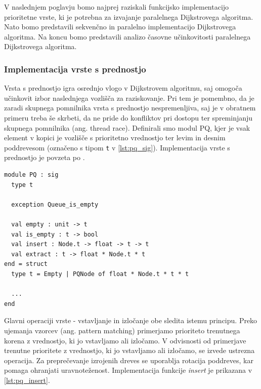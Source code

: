 \documentclass[mat1, tisk]{fmfdelo}
\begin{document}
V naslednjem poglavju bomo najprej raziskali funkcijsko implementacijo prioritetne vrste, ki je potrebna za izvajanje
paralelnega Dijkstrovega algoritma. Nato bomo predstavili sekvenčno in paralelno implementacijo Dijkstrovega algoritma. 
Na koncu bomo predstavili analizo časovne učinkovitosti paralelnega Dijkstrovega algoritma.

\subsubsection{Implementacija vrste s prednostjo}

Vrsta s prednostjo igra osrednjo vlogo v Dijkstrovem algoritmu, saj omogoča učinkovit izbor naslednjega vozlišča za raziskovanje. 
Pri tem je pomembno, da je zaradi skupnega pomnilnika vrsta s prednostjo nespremenljiva, saj je v obratnem primeru treba
še skrbeti, da ne pride do konfliktov pri dostopu ter spreminjanju skupnega pomnilnika (ang. thread race). 
Definirali smo modul PQ, kjer je vsak element v kopici je vozlišče s prioritetno vrednostjo ter levim in desnim poddrevesom
(označeno s tipom \texttt{t} v \ref{lst:pq_sig}). Implementacija vrste s prednostjo je povzeta po \cite{okasaki1996}.

\begin{lstlisting}[label=lst:pq_sig]
module PQ : sig
  type t

  exception Queue_is_empty

  val empty : unit -> t
  val is_empty : t -> bool
  val insert : Node.t -> float -> t -> t
  val extract : t -> float * Node.t * t
end = struct
  type t = Empty | PQNode of float * Node.t * t * t

  ...
end
\end{lstlisting}

Glavni operaciji vrste - vstavljanje in izločanje obe sledita istemu principu. Preko ujemanja vzorcev (ang. pattern matching)
primerjamo prioriteto trenutnega korena z vrednostjo, ki jo vstavljamo ali izločamo. V odvisnosti od primerjave trenutne
prioritete z vrednostjo, ki jo vstavljamo ali izločamo, se izvede ustrezna operacija. Za preprečevanje izrojenih dreves
se uporablja rotacija poddreves, kar pomaga ohranjati uravnoteženost. Implementacija funkcije \textit{insert} je prikazana
v \ref{lst:pq_insert}.
\end{document}
